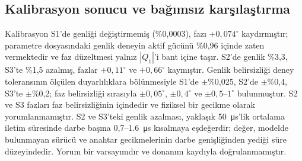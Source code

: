 \subsection{Kalibrasyon sonucu ve bağımsız karşılaştırma}

Kalibrasyon S1'de genliği değiştirmemiş (\%0,0003), fazı $+0{,}074^{\circ}$ kaydırmıştır; parametre dosyasındaki genlik deneyin aktif gücünü \%0,96 içinde zaten vermektedir ve faz düzeltmesi yalnız $|Q_1|$'i bant içine taşır. S2'de genlik \%3,3, S3'te \%1,5 azalmış, fazlar $+0{,}11^{\circ}$ ve $+0{,}66^{\circ}$ kaymıştır. Genlik belirsizliği deney toleransının ölçülen duyarlılıklara bölünmesiyle S1'de $\pm$\%0,025, S2'de $\pm$\%0,4, S3'te $\pm$\%0,2; faz belirsizliği sırasıyla $\pm0{,}05^{\circ}$, $\pm0{,}4^{\circ}$ ve $\pm0{,}5$--$1^{\circ}$ bulunmuştur. S2 ve S3 fazları faz belirsizliğinin içindedir ve fiziksel bir gecikme olarak yorumlanmamıştır. S2 ve S3'teki genlik azalması, yaklaşık \SI{50}{\micro\second}'lik ortalama iletim süresinde darbe başına 0,7--\SI{1.6}{\micro\second} kısalmaya eşdeğerdir; değer, modelde bulunmayan sürücü ve anahtar gecikmelerinin darbe genişliğinden yediği süre düzeyindedir. Yorum bir varsayımdır ve donanım kaydıyla doğrulanmamıştır.

